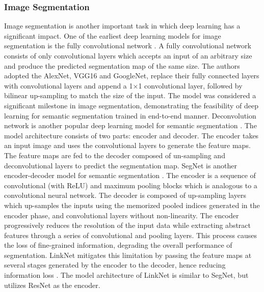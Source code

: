 \documentclass[preprint,12pt]{elsarticle}
\begin{document}
\subsubsection{Image Segmentation}
Image segmentation is another important task in which deep learning has a significant impact. One of the earliest deep learning models for image segmentation is the fully convolutional network \citep{long_fully_2015}. A fully convolutional network consists of only convolutional layers which accepts an input of an arbitrary size and produce the predicted segmentation map of the same size. The authors adopted the AlexNet, VGG16 and GoogleNet, replace their fully connected layers with convolutional layers and append a 1×1 convolutional layer, followed by bilinear up-sampling to match the size of the input. The model was considered a significant milestone in image segmentation, demonstrating the feasibility of deep learning for semantic segmentation trained in end-to-end manner. Deconvolution network is another popular deep learning model for semantic segmentation \citep{noh_learning_2015}. The model architecture consists of two parts: encoder and decoder. The encoder takes an input image and uses the convolutional layers to generate the feature maps. The feature maps are fed to the decoder composed of un-sampling and deconvolutional layers to predict the segmentation map. SegNet is another encoder-decoder model for semantic segmentation \citep{badrinarayanan_segnet_2017}. The encoder is a sequence of convolutional (with ReLU) and maximum pooling blocks which is analogous to a convolutional neural network. The decoder is composed of up-sampling layers which up-samples the inputs using the memorized pooled indices generated in the encoder phase, and convolutional layers without non-linearity. The encoder progressively reduces the resolution of the input data while extracting abstract features through a series of convolutional and pooling layers. This process causes the loss of fine-grained information, degrading the overall performance of segmentation. LinkNet mitigates this limitation by passing the feature maps at several stages generated by the encoder to the decoder, hence reducing information loss \citep{chaurasia_linknet_2017}. The model architecture of LinkNet is similar to SegNet, but utilizes ResNet as the encoder.
\end{document}
